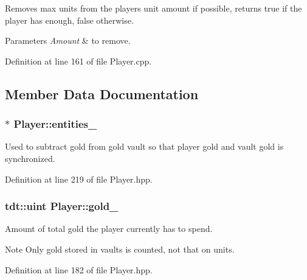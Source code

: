 Removes max units from the player\textquotesingle{}s unit amount if possible, returns true if the player has enough, false otherwise. 


\begin{DoxyParams}{Parameters}
{\em Amount} & to remove. \\
\hline
\end{DoxyParams}


Definition at line 161 of file Player.\+cpp.



\subsection{Member Data Documentation}
\subsubsection[{\texorpdfstring{entities\+\_\+}{entities_}}]{$\ast$ Player\+::entities\+\_\+\hspace{0.3cm}{\ttfamily [private]}}\hypertarget{class_player_a8cd7c8279757296dc744e61246c42390}{}\label{class_player_a8cd7c8279757296dc744e61246c42390}


Used to subtract gold from gold vault so that player gold and vault gold is synchronized. 



Definition at line 219 of file Player.\+hpp.

\subsubsection[{\texorpdfstring{gold\+\_\+}{gold_}}]{\setlength{\rightskip}{0pt plus 5cm}tdt\+::uint Player\+::gold\+\_\+\hspace{0.3cm}{\ttfamily [private]}}\hypertarget{class_player_a283e4006215fba426896111688a433b9}{}\label{class_player_a283e4006215fba426896111688a433b9}


Amount of total gold the player currently has to spend. 

\begin{DoxyNote}{Note}
Only gold stored in vaults is counted, not that on units. 
\end{DoxyNote}


Definition at line 182 of file Player.\+hpp.

